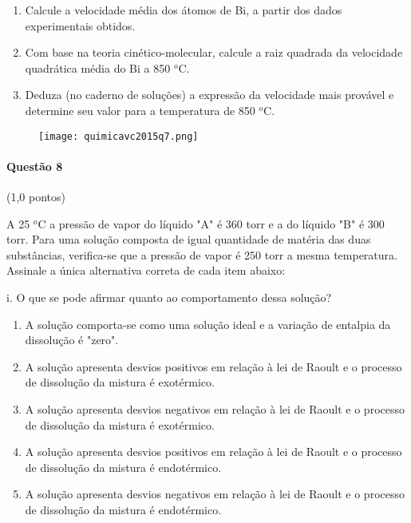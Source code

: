 \documentclass[12pt,a4paper]{article}
\begin{document}
\begin{enumerate}[label=\roman*.]

\item Calcule a velocidade média dos átomos de Bi, a partir dos dados experimentais obtidos.

\item Com base na teoria cinético-molecular, calcule a raiz quadrada da velocidade quadrática média do Bi a 850 $^o$C.

\item Deduza (no caderno de soluções) a expressão da velocidade mais provável e determine seu valor para a temperatura de 850 $^o$C.

\end{enumerate}

\begin{figure}[h]
\centering
\texttt{[image: quimicavc2015q7.png]}
\end{figure}

\paragraph{Questão 8} (1,0 pontos)

A 25 $^o$C a pressão de vapor do líquido "A" é 360 torr e a do líquido "B" é 300 torr. Para uma solução composta de igual quantidade de matéria das duas substâncias, verifica-se que a pressão de vapor é 250 torr a mesma temperatura. Assinale a única alternativa correta de cada item abaixo:

i.  O que se pode afirmar quanto ao comportamento dessa solução?

\begin{enumerate}[label=\alph*)]

\item A solução comporta-se como uma solução ideal e a variação de entalpia da dissolução é "zero".

\item A solução apresenta desvios positivos em relação à lei de Raoult e o processo de dissolução da mistura é exotérmico.

\item A solução apresenta desvios negativos em relação à lei de Raoult e o processo de dissolução da mistura é exotérmico.

\item A solução apresenta desvios positivos em relação à lei de Raoult e o processo de dissolução da mistura é endotérmico.

\item A solução apresenta desvios negativos em relação à lei de Raoult e o processo de dissolução da mistura é endotérmico.

\end{enumerate}
\end{document}
